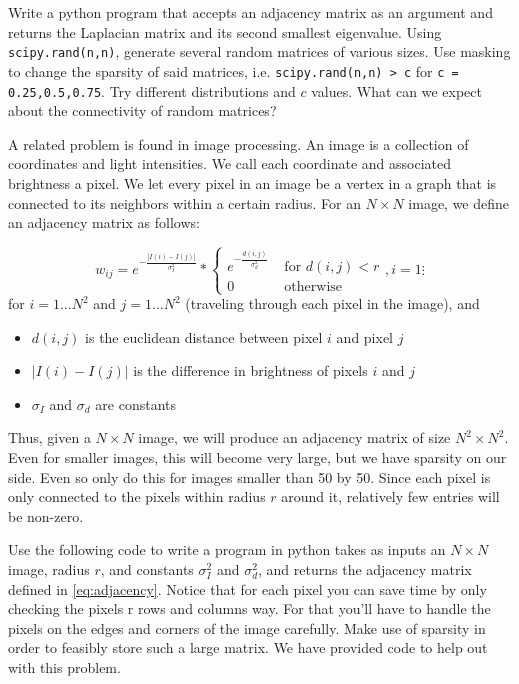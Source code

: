 \begin{problem}Write a python program that accepts an adjacency matrix as an argument and returns the Laplacian matrix and its second smallest eigenvalue.
Using {\tt scipy.rand(n,n)}, generate several random matrices of various sizes.
Use masking to change the sparsity of said matrices, i.e. {\tt scipy.rand(n,n) > c} for {\tt c = 0.25,0.5,0.75}.
Try different distributions and $c$ values.
What can we expect about the connectivity of random matrices?
\end{problem}

A related problem is found in image processing.
An image is a collection of coordinates and light intensities.
We call each coordinate and associated brightness a pixel.
We let every pixel in an image be a vertex in a graph that is connected to its neighbors within a certain radius.
For an $N \times N$ image, we define an adjacency matrix as follows:

\begin{equation}
\label{eq:adjacency}
w_{ij} = e^{-\frac{|I(i) - I(j)|}{\sigma_I^2}} * \begin{cases} e^{-\frac{d(i,j)}{\sigma_d^2}} & \mbox{ for $d(i,j) < r$} \\ 0 & \mbox{ otherwise} \end{cases}, i = 1 \vdots
\end{equation}
for $i = 1 \hdots N^2$ and $j = 1 \hdots N^2$ (traveling through each pixel in the image), and 
\begin{itemize}
	\item$d(i,j)$ is the euclidean distance between pixel $i$ and pixel $j$ 
	\item $|I(i) - I(j)|$ is the difference in brightness of pixels $i$ and $j$
	\item $\sigma_I$ and $\sigma_d$ are constants
\end{itemize} 
Thus, given a $N\times N$ image, we will produce an adjacency matrix of size $N^2\times N^2$.
Even for smaller images, this will become very large, but we have sparsity on our side.
Even so only do this for images smaller than 50 by 50.
Since each pixel is only connected to the pixels within radius $r$ around it, relatively few entries will be non-zero.

\begin{problem}  Use the following code to write a program in python takes as inputs an $N \times N$ image, radius $r$, and constants $\sigma_I^2$ and $\sigma_d^2$, and returns the adjacency matrix defined in \eqref{eq:adjacency}.
Notice that for each pixel you can save time by only checking the pixels r rows and columns way.
For that you'll have to handle the pixels on the edges and corners of the image carefully.
Make use of sparsity in order to feasibly store such a large matrix.
We have provided code to help out with this problem.
\end{problem}

